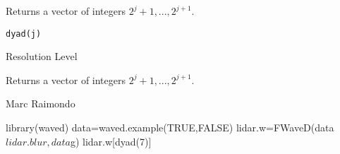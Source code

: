 \documentclass{article}
\begin{document}
\begin{Description}\relax
Returns a vector of integers $2^j+1,...,2^{j+1}$.
\end{Description}
\begin{Usage}
\begin{verbatim}
dyad(j)
\end{verbatim}
\end{Usage}
\begin{Arguments}
\begin{ldescription}
\item[\code{j}] Resolution Level
\end{ldescription}
\end{Arguments}
\begin{Value}
Returns a vector of integers $2^j+1,...,2^{j+1}$.
\end{Value}
\begin{Author}\relax
Marc Raimondo
\end{Author}
\begin{SeeAlso}\relax
{}
\end{SeeAlso}
\begin{Examples}
\begin{ExampleCode}
library(waved)
data=waved.example(TRUE,FALSE)
lidar.w=FWaveD(data$lidar.blur,data$g)
lidar.w[dyad(7)]
\end{ExampleCode}
\end{Examples}
\end{document}
